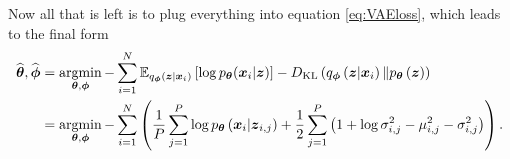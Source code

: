 Now all that is left is to plug everything into equation \eqref{eq:VAEloss}, which leads to the final form
\begin{align}\label{řešení_VAE}
 \widehat{\boldsymbol{\theta}}, \widehat{\boldsymbol{\phi}} & = \mathop{\mathrm{argmin}}_{\boldsymbol{\theta},\boldsymbol{\phi}}-\sum_{i=1}^N\mathbb{E}_{q_{\boldsymbol{\phi}}\left(\boldsymbol{z}\vert \boldsymbol{x}_i \right)}\left[\log p_{\boldsymbol{\theta}}(\boldsymbol{x}_i\vert \boldsymbol{z}) \right] - D_{\mathrm{KL}}\left(q_{\boldsymbol{\phi}}\left(\boldsymbol{z}\vert\boldsymbol{x}_i \right) \Vert p_{\boldsymbol{\theta}}\left(\boldsymbol{z}\right)\right) \\
 & = \mathop{\mathrm{argmin}}_{\boldsymbol{\theta}, \boldsymbol{\phi}}-\sum_{i = 1}^N\left(\frac{1}{P}\sum_{j = 1}^P \log p_{\boldsymbol{\theta}}\left(\boldsymbol{x}_i\vert \boldsymbol{z}_{i,j}\right) +   \frac{1}{2}\sum_{j=1}^P\left(1 + \log\sigma^2_{i,j} -\mu_{i,j}^2 -\sigma_{i,j}^2 \right)\right).
\end{align}

